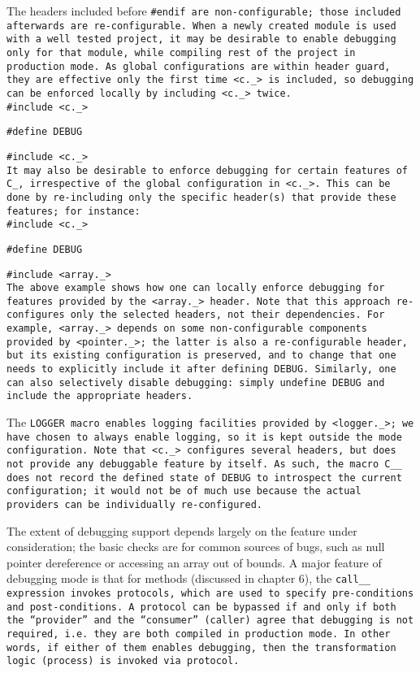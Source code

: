 The headers included before \tt{#endif} are non-configurable;
those included afterwards are re-configurable.
When a newly created module is used with a well tested project,
it may be desirable to enable debugging only for that module,
while compiling rest of the project in production mode.
As global configurations are within header guard,
they are effective only the first time \tt{<c._>} is included,
so debugging can be enforced locally by including \tt{<c._>} twice.\\

\tt{#include <c._>}

\tt{#define DEBUG}

\tt{#include <c._>}\\

It may also be desirable to enforce debugging for certain features of C\_,
irrespective of the global configuration in \tt{<c._>}.
This can be done by re-including only the specific
header(s) that provide these features; for instance:\\

\tt{#include <c._>}

\tt{#define DEBUG}

\tt{#include <array._>}\\

The above example shows how one can locally enforce
debugging for features provided by the \tt{<array._>} header.
Note that this approach re-configures only the selected headers,
not their dependencies.
For example, \tt{<array._>} depends on some
non-configurable components provided by \tt{<pointer._>};
the latter is also a re-configurable header,
but its existing configuration is preserved,
and to change that one needs to explicitly include it after defining \tt{DEBUG}.
Similarly, one can also selectively disable debugging:
simply undefine \tt{DEBUG} and include the appropriate headers.

The \tt{LOGGER} macro enables logging facilities provided by \tt{<logger._>};
we have chosen to always enable logging,
so it is kept outside the mode configuration.
Note that \tt{<c._>} configures several headers,
but does not provide any debuggable feature by itself.
As such, the macro \tt{C__} does not record the \tt{defined}
state of \tt{DEBUG} to introspect the current configuration;
it would not be of much use because the actual
providers can be individually re-configured.

The extent of debugging support depends
largely on the feature under consideration;
the basic checks are for common sources of bugs,
such as null pointer dereference or accessing an array out of bounds.
A major feature of debugging mode is that
for methods (discussed in chapter 6),
the \tt{call__} expression invokes protocols,
which are used to specify pre-conditions and post-conditions.
A protocol can be bypassed if and only if both the ``provider''
and the ``consumer'' (caller) agree that debugging is not required,
i.e. they are both compiled in production mode.
In other words, if either of them enables debugging,
then the transformation logic (process) is invoked via protocol.

